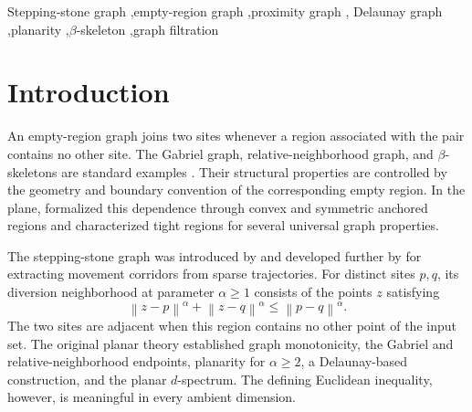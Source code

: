 \documentclass[a4paper,fleqn]{cas-sc}
\theoremstyle{definition}
\theoremstyle{remark}
\newcommand{\norm}[1]{\left\lVert #1\right\rVert}
\newcommand{\0}{\mathbf{0}}
\begin{document}
\begin{keywords}
Stepping-stone graph \sep empty-region graph \sep proximity graph \sep
Delaunay graph \sep planarity \sep \(\beta\)-skeleton \sep graph filtration
\end{keywords}

\maketitle

\ifdefined\SubmissionVersion
  \hypersetup{hidelinks}
\fi

\section{Introduction}

An empty-region graph joins two sites whenever a region associated with the
pair contains no other site. The Gabriel graph, relative-neighborhood graph,
and \(\beta\)-skeletons are standard examples
\citep{gabriel1969statistical,toussaint1980relative,
jaromczyk1992relative,kirkpatrick1985framework}. Their structural properties
are controlled by the geometry and boundary convention of the corresponding
empty region. In the plane, \citet{cardinal2009empty} formalized this
dependence through convex and symmetric anchored regions and characterized
tight regions for several universal graph properties.

The stepping-stone graph was introduced by
\citet{kannangara2018stepping} and developed further by
\citet{kannangara2019stepping} for extracting movement corridors from sparse
trajectories. For distinct sites \(p,q\), its diversion neighborhood at
parameter \(\alpha\geq1\) consists of the points \(z\) satisfying
\begin{equation}
\norm{z-p}^{\alpha}+\norm{z-q}^{\alpha}
\leq \norm{p-q}^{\alpha}.
\end{equation}
The two sites are adjacent when this region contains no other point of the
input set. The original planar theory established graph monotonicity, the
Gabriel and relative-neighborhood endpoints, planarity for \(\alpha\geq2\),
a Delaunay-based construction, and the planar \(d\)-spectrum. The defining
Euclidean inequality, however, is meaningful in every ambient dimension.
\end{document}

